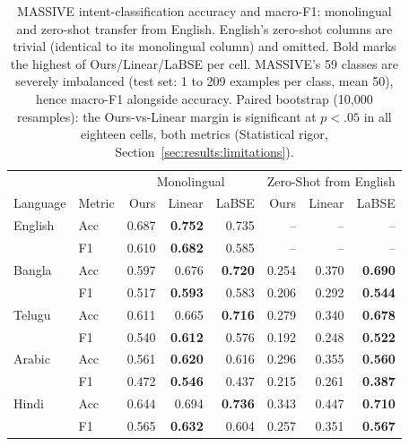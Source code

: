 \documentclass[manuscript]{acmart}
\begin{document}
\begin{table}[h]
\caption{MASSIVE intent-classification accuracy and macro-F1: monolingual and zero-shot transfer from English. English's zero-shot columns are trivial (identical to its monolingual column) and omitted. Bold marks the highest of Ours/Linear/LaBSE per cell. MASSIVE's 59 classes are severely imbalanced (test set: 1 to 209 examples per class, mean 50), hence macro-F1 alongside accuracy. Paired bootstrap (10,000 resamples): the Ours-vs-Linear margin is significant at $p<.05$ in all eighteen cells, both metrics (Statistical rigor, Section~\ref{sec:results:limitations}).}
\label{tab:classification}
\begin{tabular}{@{}llrrrrrr@{}}
\toprule
& & \multicolumn{3}{c}{Monolingual} & \multicolumn{3}{c}{Zero-Shot from English} \\
Language & Metric & Ours & Linear & LaBSE & Ours & Linear & LaBSE \\
\midrule
English & Acc & 0.687 & \textbf{0.752} & 0.735 & -- & -- & -- \\
        & F1  & 0.610 & \textbf{0.682} & 0.585 & -- & -- & -- \\
\midrule
Bangla  & Acc & 0.597 & 0.676 & \textbf{0.720} & 0.254 & 0.370 & \textbf{0.690} \\
        & F1  & 0.517 & \textbf{0.593} & 0.583 & 0.206 & 0.292 & \textbf{0.544} \\
\midrule
Telugu  & Acc & 0.611 & 0.665 & \textbf{0.716} & 0.279 & 0.340 & \textbf{0.678} \\
        & F1  & 0.540 & \textbf{0.612} & 0.576 & 0.192 & 0.248 & \textbf{0.522} \\
\midrule
Arabic  & Acc & 0.561 & \textbf{0.620} & 0.616 & 0.296 & 0.355 & \textbf{0.560} \\
        & F1  & 0.472 & \textbf{0.546} & 0.437 & 0.215 & 0.261 & \textbf{0.387} \\
\midrule
Hindi   & Acc & 0.644 & 0.694 & \textbf{0.736} & 0.343 & 0.447 & \textbf{0.710} \\
        & F1  & 0.565 & \textbf{0.632} & 0.604 & 0.257 & 0.351 & \textbf{0.567} \\
\bottomrule
\end{tabular}
\end{table}
\end{document}
